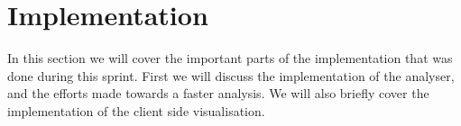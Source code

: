 \section{Implementation}

In this section we will cover the important parts of the implementation that was done during this sprint. First we will discuss the implementation of the analyser, and the efforts made towards a faster analysis. We will also briefly cover the implementation of the client side visualisation.



